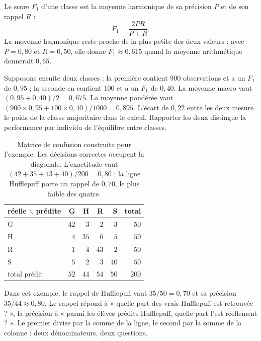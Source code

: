 Le score $F_1$ d'une classe est la moyenne harmonique de sa précision $P$ et de
son rappel $R$ :
\[
  F_1=\frac{2PR}{P+R}.
\]
La moyenne harmonique reste proche de la plus petite des deux valeurs : avec
$P=0{,}80$ et $R=0{,}50$, elle donne $F_1\approx0{,}615$ quand la moyenne
arithmétique donnerait $0{,}65$.

Supposons ensuite deux classes : la première contient $900$ observations et a un
$F_1$ de $0{,}95$ ; la seconde en contient $100$ et a un $F_1$ de $0{,}40$. La
moyenne macro vaut $(0{,}95+0{,}40)/2=0{,}675$. La moyenne pondérée vaut
$(900\times0{,}95+100\times0{,}40)/1000=0{,}895$. L'écart de $0{,}22$ entre les
deux mesure le poids de la classe majoritaire dans le calcul. Rapporter les deux
distingue la performance par individu de l'équilibre entre classes.

\begin{table}[htbp]
\centering
\setlength{\tabcolsep}{9pt}
\begin{tabular}{lrrrr|r}
\toprule
réelle $\backslash$ prédite & G & H & R & S & total \\
\midrule
G & \cellcolor{accent!35}$42$ & $3$ & $2$ & $3$ & $50$ \\
H & $4$ & \cellcolor{accent!35}$35$ & $6$ & $5$ & $50$ \\
R & $1$ & $4$ & \cellcolor{accent!35}$43$ & $2$ & $50$ \\
S & $5$ & $2$ & $3$ & \cellcolor{accent!35}$40$ & $50$ \\
\midrule
total prédit & $52$ & $44$ & $54$ & $50$ & $200$ \\
\bottomrule
\end{tabular}
\caption{Matrice de confusion construite pour l'exemple. Les décisions correctes
occupent la diagonale. L'exactitude vaut $(42+35+43+40)/200=0{,}80$ ; la ligne
Hufflepuff porte un rappel de $0{,}70$, le plus faible des quatre.}
\label{tab:confusion-example}
\end{table}

Dans cet exemple, le rappel de Hufflepuff vaut $35/50=0{,}70$ et sa précision
$35/44\approx0{,}80$. Le rappel répond à « quelle part des vrais Hufflepuff est
retrouvée ? », la précision à « parmi les élèves prédits Hufflepuff, quelle part
l'est réellement ? ». Le premier divise par la somme de la ligne, le second par
la somme de la colonne : deux dénominateurs, deux questions.

